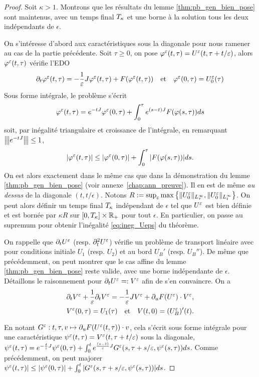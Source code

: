 \begin{proof}
Soit $\kappa > 1$. 
Montrons que les résultats du lemme \ref{thm:pb_gen_bien_pose} sont maintenus, avec un temps final $T_{\kappa}$ et une borne à la solution tous les deux indépendants de $\epsilon$. 

On s'intéresse d'abord aux caractéristiques sous la diagonale pour nous ramener au cas de la partie précédente. 
Soit $\tau \geq 0$, on pose $\varphi^{\varepsilon}(t,\tau) = U^{\varepsilon}(t,\tau+t/\varepsilon)$, alors $\varphi^{\varepsilon}(t,\tau)$ vérifie l'EDO 
$$ \partial_t \varphi^{\varepsilon}(t,\tau) = -\frac{1}{\varepsilon} J\varphi^{\varepsilon}(t,\tau) + F(\varphi^{\varepsilon}(t,\tau)) \quad\text{et}\quad \varphi^{\varepsilon}(0,\tau) = U_0^{\varepsilon}(\tau) $$
Sous forme intégrale, le problème s'écrit 
$$ \varphi^{\varepsilon}(t,\tau) = e^{-tJ}\varphi^{\varepsilon}(0,\tau) + \int_0^{\tau} e^{(s-t)J} F(\varphi(s,\tau))ds $$
soit, par inégalité triangulaire et croissance de l'intégrale, en remarquant ${\left\vert\kern-0.25ex\left\vert\kern-0.25ex\left\vert e^{-tJ} \right\vert\kern-0.25ex\right\vert\kern-0.25ex\right\vert} \leq 1$, 
\begin{equation} \label{ineq:phi_eps}
|\varphi^{\varepsilon}(t,\tau)| \leq |\varphi^{\varepsilon}(0,\tau)| + \int_0^{\tau} |F(\varphi(s,\tau))|ds. 
\end{equation}
On est alors exactement dans le même cas que dans la démonstration du lemme \ref{thm:pb_gen_bien_pose} (voir annexe~\ref{chap:ann_preuve}). 
Il en est de même \textit{au dessus} de la diagonale $(t,t/\epsilon)$. Notons $R := \sup_{\varepsilon} \max \left\{\|U_0^{\varepsilon}\|_{L^{\infty}_{\tau}},\|U_0^{\varepsilon}\|_{L^{\infty}_t}\right\}$. 
On peut alors définir un temps final $T_{\kappa}$ indépendant de $\epsilon$ tel que $U^{\varepsilon}$ est bien définie et est bornée par $\kappa R$ sur $[0,T_{\kappa}]\times\mathbb{R}_+$ pour tout $\epsilon$. En particulier, on passe au supremum pour obtenir l'inégalité \eqref{eq:ineg_Ueps} du théorème. 

\vspace*{7pt}
On rappelle que $\partial_t U^{\varepsilon}$ (resp. $\partial_t^2 U^{\varepsilon}$) vérifie un problème de transport linéaire avec pour conditions initiale $U_1$ (resp. $U_2$) et au bord $U_B'$ (resp. $U_B''$). De même que précédemment, on peut montrer que le cas affine du lemme \ref{thm:pb_gen_bien_pose} reste valide, avec une borne indépendante de $\epsilon$. Détaillons le raisonnement pour $\partial_t U^{\varepsilon} =: V^{\varepsilon}$ afin de s'en convaincre. On a 
$$ \begin{array}{c} \displaystyle
\dpt V\eeps + \inveps\dpt V\eeps = -\inveps J V\eeps + \dpu F(U\eeps)\cdot V\eeps, 
\\ \displaystyle \vphantom{\inveps}
V\eeps(0,\tau) = U_1(\tau) \quad\text{et}\quad V(t,0) = (U_B\eeps)'(t).
\end{array} $$
En notant $G^{\varepsilon}:t,\tau,v \mapsto \partial_{u} F(U^{\varepsilon}(t,\tau))\cdot v$, cela s'écrit sous forme intégrale pour une caractéristique $\psi^{\varepsilon}(t,\tau) = V^{\varepsilon}(t,\tau+t/\varepsilon)$ sous la diagonale, $\psi^{\varepsilon}(t,\tau) = e^{-\frac{t}{\varepsilon}J}\psi^{\varepsilon}(0,\tau) + \int_0^t e^{\frac{(s-t)}{\varepsilon}J} G^{\varepsilon}(s,\tau+s/\varepsilon,\psi^{\varepsilon}(s,\tau))ds$. 
Comme précédemment, on peut majorer $\psi^{\varepsilon}(t,\tau)| \leq |\psi^{\varepsilon}(0,\tau)| + \int_0^t |G^{\varepsilon}(s,\tau+s/\varepsilon,\psi^{\varepsilon}(s,\tau))|ds$. 


\end{proof}
